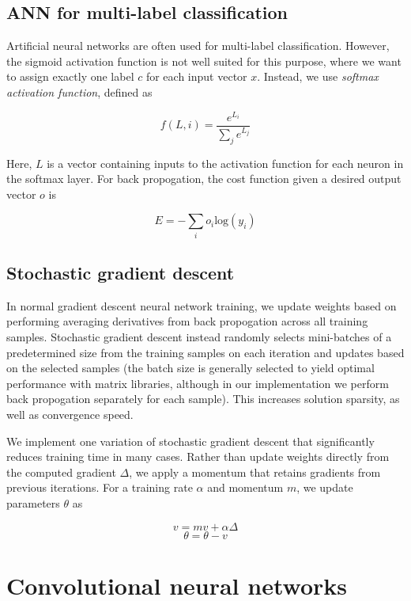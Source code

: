 \documentclass[12pt,twocolumn]{article}
\begin{document}
\subsection{ANN for multi-label classification}

Artificial neural networks are often used for multi-label classification. However, the sigmoid activation function is not well suited for this purpose, where we want to assign exactly one label $c$ for each input vector $x$. Instead, we use \emph{softmax activation function}, defined as

$$f(L, i) = \frac{e^{L_i}}{\sum_j e^{L_j}}$$

Here, $L$ is a vector containing inputs to the activation function for each neuron in the softmax layer. For back propogation, the cost function given a desired output vector $o$ is

$$E = -\sum_i o_i \text{log}(y_i)$$


\subsection{Stochastic gradient descent}

In normal gradient descent neural network training, we update weights based on performing averaging derivatives from back propogation across all training samples. Stochastic gradient descent instead randomly selects mini-batches of a predetermined size from the training samples on each iteration and updates based on the selected samples (the batch size is generally selected to yield optimal performance with matrix libraries, although in our implementation we perform back propogation separately for each sample). This increases solution sparsity, as well as convergence speed.

We implement one variation of stochastic gradient descent that significantly reduces training time in many cases. Rather than update weights directly from the computed gradient $\Delta$, we apply a momentum that retains gradients from previous iterations. For a training rate $\alpha$ and momentum $m$, we update parameters $\theta$ as


$$v = mv + \alpha \Delta$$
$$\theta = \theta - v$$

\section{Convolutional neural networks} \label{sec:cnn}
\end{document}
